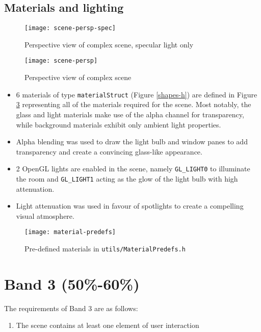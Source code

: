 \documentclass{article}
\begin{document}
		\subsection{Materials and lighting}
		\begin{minipage}{0.5\textwidth}
			\begin{figure}[H]
				\centering
				\texttt{[image: scene-persp-spec]}
				\caption{Perspective view of complex scene, specular light only}
				\label{scene-persp-spec}
			\end{figure}		
		\end{minipage}
		\begin{minipage}{0.5\textwidth}
			\begin{figure}[H]
				\centering	
				\texttt{[image: scene-persp]}
				\caption{Perspective view of complex scene\newline}
				\label{scene-persp}
			\end{figure}		
		\end{minipage}
		\begin{itemize}
			\item 6 materials of type \texttt{materialStruct} (Figure \ref{shapes-h}) are defined in
			Figure \ref{material-predefs} representing all
			of the materials required for the scene. Most notably, the glass and light materials make use of the alpha channel
			for transparency, while background materials exhibit only ambient light properties.
			\item Alpha blending was used to draw the light bulb and window panes to add transparency and
			create a convincing glass-like appearance.
			\item 2 OpenGL lights are enabled in the scene, namely \texttt{GL\_LIGHT0} to illuminate the room and
			\texttt{GL\_LIGHT1} acting
			as the glow of the light bulb with high attenuation.
			\item Light attenuation was used in favour of spotlights to create a compelling visual atmosphere.
		\end{itemize}

		\begin{figure}[h]
			\centering	
			\texttt{[image: material-predefs]}
			\caption{Pre-defined materials in \texttt{utils/MaterialPredefs.h}}
			\label{material-predefs}
		\end{figure}



	\clearpage
	\section{Band 3 (50\%-60\%)}\label{ui}
	The requirements of Band 3 are as follows:
	\begin{enumerate}
		\item The scene contains at least one element of user interaction
	\end{enumerate}
\end{document}
